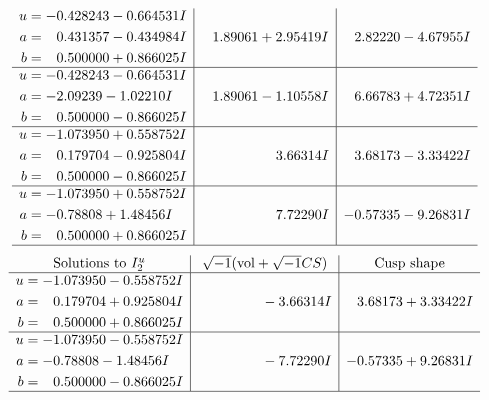 \documentclass[1p]{elsarticle_modified}
\theoremstyle{definition}
\newcommand{\I}{\sqrt{-1}}
\begin{document}
$$\begin{array}{c|c|c}
\begin{aligned}
u &= -0.428243 - 0.664531 I \\
a &= \phantom{-}0.431357 - 0.434984 I \\
b &= \phantom{-}0.500000 + 0.866025 I\end{aligned}
 & \phantom{-}1.89061 + 2.95419 I & \phantom{-}2.82220 - 4.67955 I \\ \hline\begin{aligned}
u &= -0.428243 - 0.664531 I \\
a &= -2.09239 - 1.02210 I \\
b &= \phantom{-}0.500000 - 0.866025 I\end{aligned}
 & \phantom{-}1.89061 - 1.10558 I & \phantom{-}6.66783 + 4.72351 I \\ \hline\begin{aligned}
u &= -1.073950 + 0.558752 I \\
a &= \phantom{-}0.179704 - 0.925804 I \\
b &= \phantom{-}0.500000 - 0.866025 I\end{aligned}
 & \phantom{-0.000000 -}3.66314 I & \phantom{-}3.68173 - 3.33422 I \\ \hline\begin{aligned}
u &= -1.073950 + 0.558752 I \\
a &= -0.78808 + 1.48456 I \\
b &= \phantom{-}0.500000 + 0.866025 I\end{aligned}
 & \phantom{-0.000000 -}7.72290 I & -0.57335 - 9.26831 I\\
 \hline 
 \end{array}$$\newpage$$\begin{array}{c|c|c}  
\text{Solutions to }I^u_{2}& \I (\text{vol} + \sqrt{-1}CS) & \text{Cusp shape}\\
 \hline 
\begin{aligned}
u &= -1.073950 - 0.558752 I \\
a &= \phantom{-}0.179704 + 0.925804 I \\
b &= \phantom{-}0.500000 + 0.866025 I\end{aligned}
 & \phantom{-0.000000 } -3.66314 I & \phantom{-}3.68173 + 3.33422 I \\ \hline\begin{aligned}
u &= -1.073950 - 0.558752 I \\
a &= -0.78808 - 1.48456 I \\
b &= \phantom{-}0.500000 - 0.866025 I\end{aligned}
 & \phantom{-0.000000 } -7.72290 I & -0.57335 + 9.26831 I\\
 \hline 
 \end{array}$$\newpage
\end{document}
